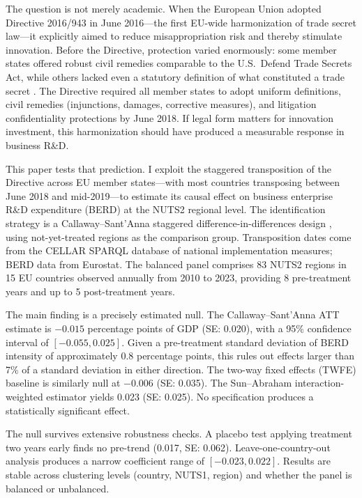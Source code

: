 \documentclass[12pt]{article}
\begin{document}
The question is not merely academic. When the European Union adopted Directive 2016/943 in June 2016---the first EU-wide harmonization of trade secret law---it explicitly aimed to reduce misappropriation risk and thereby stimulate innovation. Before the Directive, protection varied enormously: some member states offered robust civil remedies comparable to the U.S.\ Defend Trade Secrets Act, while others lacked even a statutory definition of what constituted a trade secret \citep{BakerMcKenzie2016}. The Directive required all member states to adopt uniform definitions, civil remedies (injunctions, damages, corrective measures), and litigation confidentiality protections by June 2018. If legal form matters for innovation investment, this harmonization should have produced a measurable response in business R\&D.

This paper tests that prediction. I exploit the staggered transposition of the Directive across EU member states---with most countries transposing between June 2018 and mid-2019---to estimate its causal effect on business enterprise R\&D expenditure (BERD) at the NUTS2 regional level. The identification strategy is a Callaway--Sant'Anna staggered difference-in-differences design \citep{CallawayS2021}, using not-yet-treated regions as the comparison group. Transposition dates come from the CELLAR SPARQL database of national implementation measures; BERD data from Eurostat. The balanced panel comprises 83 NUTS2 regions in 15 EU countries observed annually from 2010 to 2023, providing 8 pre-treatment years and up to 5 post-treatment years.

The main finding is a precisely estimated null. The Callaway--Sant'Anna ATT estimate is $-0.015$ percentage points of GDP (SE: 0.020), with a 95\% confidence interval of $[-0.055, 0.025]$. Given a pre-treatment standard deviation of BERD intensity of approximately 0.8 percentage points, this rules out effects larger than 7\% of a standard deviation in either direction. The two-way fixed effects (TWFE) baseline is similarly null at $-0.006$ (SE: 0.035). The Sun--Abraham interaction-weighted estimator yields 0.023 (SE: 0.025). No specification produces a statistically significant effect.

The null survives extensive robustness checks. A placebo test applying treatment two years early finds no pre-trend (0.017, SE: 0.062). Leave-one-country-out analysis produces a narrow coefficient range of $[-0.023, 0.022]$. Results are stable across clustering levels (country, NUTS1, region) and whether the panel is balanced or unbalanced.
\end{document}
